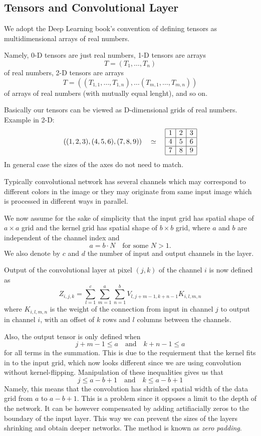 \documentclass[]{article}
\begin{document}
\subsection{Tensors and Convolutional Layer}
We adopt the Deep Learning book's convention of defining tensors as
multidimensional arrays of real numbers.

Namely, 0-D tensors are just real numbers, 1-D tensors are arrays
\[
T = (T_1, \ldots, T_n)
\]
of real numbers, 2-D tensors are arrays
\[
T = ((T_{1,1}, \ldots, T_{1,n}), \ldots (T_{m,1}, \ldots, T_{m,n}))
\]
of arrays of real numbers (with mutually equal lenght), and so on.

Basically our tensors can be viewed as D-dimensional grids of real numbers.
Example in 2-D:
\[
((1, 2, 3), (4, 5, 6), (7, 8, 9)) \quad \simeq \quad
\begin{array}{|c|c|c|}
  \hline
  1 & 2 & 3 \\
  \hline
  4 & 5 & 6 \\
  \hline
  7 & 8 & 9 \\
  \hline
\end{array}
\]
In general case the sizes of the axes do not need to match.

Typically convolutional network has several channels which may correspond to different
colors in the image or they may originate from same input image which is processed
in different ways in parallel.

We now assume for the sake of simplicity that the input grid has spatial shape of
$a \times a$ grid and the kernel grid has spatial shape of $b \times b$ grid, where
$a$ and $b$ are independent of the channel index and
\[
a = b \cdot N \quad \text{for some $N > 1$}.
\]
We also denote by $c$ and $d$ the number of input and output channels in the layer.

Output of the convolutional layer at pixel $(j, k)$ of the channel $i$ is now
defined as
\[
Z_{i, j, k} = \sum_{l=1}^c \sum_{m = 1}^a \sum_{n=1}^b
V_{l, j + m -1, k + n -1} K_{i, l, m, n}
\]
where $K_{i, l, m, n}$ is the weight of the connection from input in channel $j$
to output in channel $i$, with an offset of $k$ rows and $l$ columns between the
channels.

Also, the output tensor is only defined when
\[
j + m - 1 \le a \quad \text{and} \quad k + n - 1 \le a
\]
for all terms in the summation. This is due to the requierment that the kernel fits
in to the input grid, which now looks different since we are using convolution
without kernel-flipping. Manipulation of these inequalities gives us that
\[
 j \le a - b + 1\quad \text{and} \quad  k \le a - b + 1
\]
Namely, this means that the convolution has shrinked spatial width of the data grid
from $a$ to $a - b + 1$. This is a problem since it opposes a limit to the depth of
the network. It can be however compensated by adding artifiacially zeros to the
boundary of the input layer. This way we can prevent the sizes of the layers shrinking
and obtain deeper networks. The method is known as \emph{zero padding}.
\end{document}
